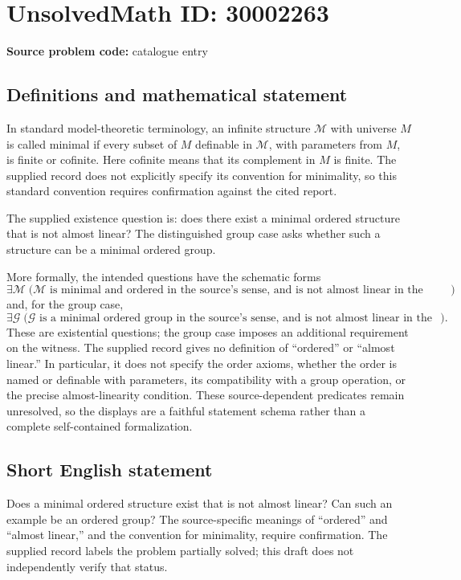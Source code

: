 \documentclass[11pt]{article}
\begin{document}
\section*{UnsolvedMath ID: 30002263}
\textbf{Source problem code:} catalogue entry
\subsection{Definitions and mathematical statement}
In standard model-theoretic terminology, an infinite structure \(\mathcal M\) with universe \(M\) is called minimal if every subset of \(M\) definable in \(\mathcal M\), with parameters from \(M\), is finite or cofinite. Here cofinite means that its complement in \(M\) is finite. The supplied record does not explicitly specify its convention for minimality, so this standard convention requires confirmation against the cited report.

The supplied existence question is: does there exist a minimal ordered structure that is not almost linear? The distinguished group case asks whether such a structure can be a minimal ordered group.

More formally, the intended questions have the schematic forms
\[
\exists\mathcal M\;\bigl(\mathcal M\text{ is minimal and ordered in the source's sense, and is not almost linear in the source's sense}\bigr)
\]
and, for the group case,
\[
\exists\mathcal G\;\bigl(\mathcal G\text{ is a minimal ordered group in the source's sense, and is not almost linear in the source's sense}\bigr).
\]
These are existential questions; the group case imposes an additional requirement on the witness. The supplied record gives no definition of ``ordered'' or ``almost linear.'' In particular, it does not specify the order axioms, whether the order is named or definable with parameters, its compatibility with a group operation, or the precise almost-linearity condition. These source-dependent predicates remain unresolved, so the displays are a faithful statement schema rather than a complete self-contained formalization.
\subsection{Short English statement}
Does a minimal ordered structure exist that is not almost linear? Can such an example be an ordered group? The source-specific meanings of ``ordered'' and ``almost linear,'' and the convention for minimality, require confirmation. The supplied record labels the problem partially solved; this draft does not independently verify that status.
\end{document}
